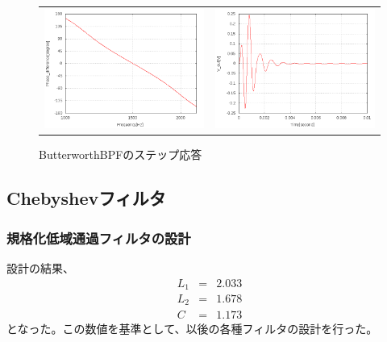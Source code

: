 \documentclass[10pt,a4j,dvipdfmx]{jsarticle}
\makeatletter
\let\@oldsubsec\subsection
\renewcommand{\subsection}[1]{\vspace{-7pt}\@oldsubsec{#1}}
\makeatother
\begin{document}
   \begin{figure}[H]
       \begin{tabular}{cc}
         \begin{minipage}[t]{0.45\hsize}
           \centering
           \includegraphics[width=8cm]{BBPF_Agraf.png}
           \caption{ButterworthBPFの位相特性}
         \end{minipage} &
         \begin{minipage}[t]{0.45\hsize}
           \centering
           \includegraphics[width = 8cm]{BBPFstep.png}
           \caption{ButterworthBPFのステップ応答}
         \end{minipage}
       \end{tabular}
     \end{figure}
          
\subsection{Chebyshevフィルタ}
\subsubsection{規格化低域通過フィルタの設計}
設計の結果、
\begin{eqnarray}
L_1 &=& 2.033 \\
L_2 &=& 1.678 \\
C &=& 1.173
\end{eqnarray}
となった。この数値を基準として、以後の各種フィルタの設計を行った。
\end{document}
